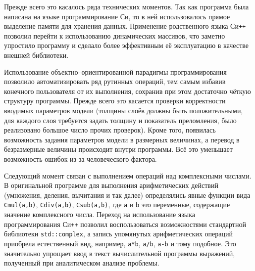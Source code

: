 Прежде всего это касалось ряда технических моментов. Так как программа
была написана на языке программирование Си, то в ней использовалось
прямое выделение памяти для хранения данных.  Применение
родственного языка Си\texttt{++} позволил перейти к использованию
динамических массивов, что заметно упростило
программу и сделало более эффективным её эксплуатацию в качестве
внешней библиотеки.

Использование объектно--ориентированной парадигмы программирования
позволило автоматизировать ряд рутинных операций, тем самым избавив
конечного пользователя от их выполнения, сохранив при этом достаточно
чёткую структуру программы.  Прежде всего это касается проверки
корректности вводимых параметров модели (толщины слоёв должны быть
положительными, для каждого слоя требуется задать толщину и показатель
преломления, было реализовано большое число прочих проверок). Кроме
того, появилась возможность задания параметров модели в размерных
величинах, а перевод в безразмерные величины происходит внутри
программы. Всё это уменьшает возможность ошибок из-за человеческого
фактора.

Следующий момент связан с выполнением операций над комплексными
числами.  В оригинальной программе для выполнения арифметических
действий (умножения, деления, вычитания и так далее) определялись
явные функции вида \verb+Cmul(a,b)+, \verb+Cdiv(a,b)+,
\verb+Csub(a,b)+, где \verb+a+ и \verb+b+ это переменные, содержащие
значение комплексного числа.  Переход на использование языка
программирования Си\texttt{++} позволил воспользоваться возможностями
стандартной библиотеки \verb+std::complex+, а запись упомянутых
арифметических операций приобрела естественный вид, например,
\verb!a*b!, \verb!a/b!, \verb!a-b! и тому подобное.  Это значительно
упрощает ввод в текст вычислительной программы выражений, полученный
при аналитическом анализе проблемы.

